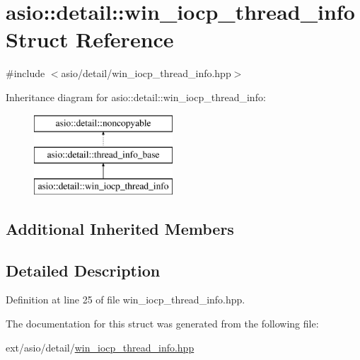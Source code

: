 \hypertarget{structasio_1_1detail_1_1win__iocp__thread__info}{}\section{asio\+:\+:detail\+:\+:win\+\_\+iocp\+\_\+thread\+\_\+info Struct Reference}
\label{structasio_1_1detail_1_1win__iocp__thread__info}


{\ttfamily \#include $<$asio/detail/win\+\_\+iocp\+\_\+thread\+\_\+info.\+hpp$>$}

Inheritance diagram for asio\+:\+:detail\+:\+:win\+\_\+iocp\+\_\+thread\+\_\+info\+:\begin{figure}[H]
\begin{center}
\leavevmode
\includegraphics[height=3.000000cm]{structasio_1_1detail_1_1win__iocp__thread__info}
\end{center}
\end{figure}
\subsection*{Additional Inherited Members}


\subsection{Detailed Description}


Definition at line 25 of file win\+\_\+iocp\+\_\+thread\+\_\+info.\+hpp.



The documentation for this struct was generated from the following file\+:\begin{DoxyCompactItemize}
\item 
ext/asio/detail/\hyperlink{win__iocp__thread__info_8hpp}{win\+\_\+iocp\+\_\+thread\+\_\+info.\+hpp}\end{DoxyCompactItemize}
